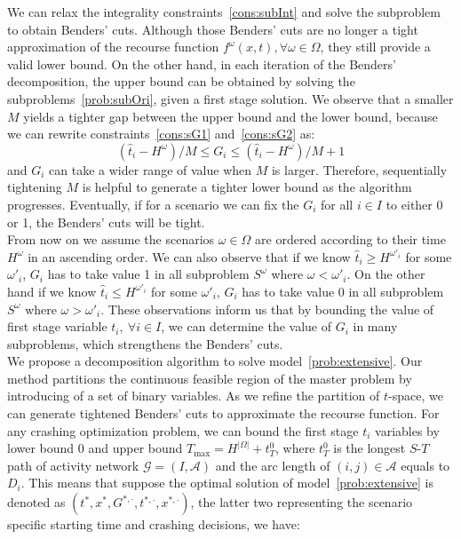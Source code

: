 \documentclass[11pt]{article}
\begin{document}
	We can relax the integrality constraints~\eqref{cons:subInt} and solve the subproblem to obtain Benders' cuts. Although those Benders' cuts are no longer a tight approximation of the recourse function \(f^\omega(x,t), \forall \omega \in \Omega\), they still provide a valid lower bound. On the other hand, in each iteration of the Benders' decomposition, the upper bound can be obtained by solving the subproblems~\eqref{prob:subOri}, given a first stage solution. We observe that a smaller \(M\) yields a tighter gap between the upper bound and the lower bound, because we can rewrite constraints~\eqref{cons:sG1} and~\eqref{cons:sG2} as:
	\begin{equation}
		(\hat{t}_i - H^\omega)/M \leq G_i \leq (\hat{t}_i - H^\omega)/M + 1
	\end{equation}
	and \(G_i\) can take a wider range of value when \(M\) is larger. Therefore, sequentially tightening \(M\) is helpful to generate a tighter lower bound as the algorithm progresses. Eventually, if for a scenario we can fix the \(G_i\) for all \(i \in I\) to either 0 or 1, the Benders' cuts will be tight.\\
	\newline
	From now on we assume the scenarios \(\omega \in \Omega\) are ordered according to their time \(H^\omega\) in an ascending order. We can also observe that if we know \(\hat{t}_i \geq H^{\omega'_i}\) for some \(\omega'_i\), \(G_i\) has to take value 1 in all subproblem \(S^\omega\) where \(\omega < \omega'_i\). On the other hand if we know \(\hat{t}_i \leq H^{\omega'_i}\) for some \(\omega'_i\), \(G_i\) has to take value 0 in all subproblem \(S^\omega\) where \(\omega > \omega'_i\). These observations inform us that by bounding the value of first stage variable \(t_i,\ \forall i \in I\), we can determine the value of \(G_i\) in many subproblems, which strengthens the Benders' cuts.\\
	\newline
	We propose a decomposition algorithm to solve model~\eqref{prob:extensive}. Our method partitions the continuous feasible region of the master problem by introducing of a set of binary variables. As we refine the partition of \(t\)-space, we can generate tightened Benders' cuts to approximate the recourse function. For any crashing optimization problem, we can bound the first stage \(t_i\) variables by lower bound \(0\) and upper bound \(T_{\max} = H^{|\Omega|} + t_T^0\), where \(t_T^0\) is the longest \(S\)-\(T\) path of activity network \(\mathcal{G} = (I,\mathcal{A})\) and the arc length of \((i,j) \in \mathcal{A}\) equals to \(D_i\). This means that suppose the optimal solution of model~\eqref{prob:extensive} is denoted as \((t^*,x^*,G^{*,\cdot},t^{*,\cdot},x^{*,\cdot})\), the latter two representing the scenario specific starting time and crashing decisions, we have:
\end{document}

